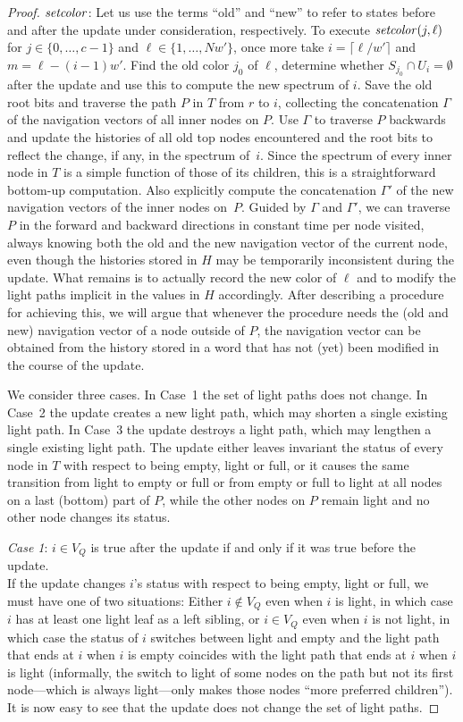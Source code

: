 \documentclass[envcountsame,envcountsect,undated,nolinenumbers]{lnthi}
\def\Tvn#1{\hbox{\textit{#1\/}}}
\def\Tceil#1{\lceil #1\rceil}
\begin{document}
\begin{proof}
\medskip\noindent
$\Tvn{setcolor}$:
Let us use the terms ``old'' and ``new'' to refer
to states before and after the update
under consideration, respectively.
To execute $\Tvn{setcolor}(j,\ell)$
for $j\in\{0,\ldots,c-1\}$ and $\ell\in\{1,\ldots,N w'\}$,
once more take
$i=\Tceil{{\ell/{w'}}}$ and $m=\ell-(i-1)w'$.
Find the old color $j_0$ of $\ell$,
determine whether $S_{j_0}\cap U_{i}=\emptyset$
after the update and use this
to compute the new spectrum of $i$.
Save the old root bits and
traverse the path $P$ in $T$ from $r$ to $i$, collecting
the concatenation $\Gamma$ of the navigation vectors
of all inner nodes on $P$.
Use $\Gamma$ to traverse $P$ backwards
and update the histories of all old top nodes
encountered and the root bits to reflect the change,
if any, in the spectrum of~$i$.
Since the spectrum of every inner node
in $T$ is a simple function of those of
its children, this is a straightforward
bottom-up computation.
Also explicitly compute the concatenation
$\Gamma'$
of the
new navigation vectors of the inner nodes on~$P$.
Guided by $\Gamma$ and $\Gamma'$, we can traverse $P$
in the forward and backward directions
in constant time per node visited, always
knowing both the old and the new navigation vector
of the current node, even though the
histories stored in $H$ may be temporarily
inconsistent during the update.
What remains is to actually record the new
color of $\ell$ and to modify the light paths
implicit in the values in $H$ accordingly.
After describing a procedure for achieving this,
we will argue that whenever the procedure needs the
(old and new) navigation vector of a node
outside of $P$, the navigation vector can
be obtained from the history stored in
a word that has not (yet) been modified in the
course of the update.

We consider three cases.
In Case~1 the set of light paths does not change.
In Case~2 the update creates a new light path,
which may shorten a single existing light path.
In Case~3 the update destroys
a light path, which may
lengthen a single existing light path.
The update either leaves invariant the status of
every node in $T$ with respect to being
empty, light or full,
or it causes the same transition from light
to empty or full or from empty or full
to light at all nodes
on a last (bottom) part of $P$, while the
other nodes on $P$ remain light and no other
node changes its status.

\medskip
\emph{Case 1}:
$i\in V_Q$
is true after the update
if and only if it was true before the update.\\
If the update changes $i$'s status with respect to
being empty, light or full, we must have one of
two situations:
Either $i\not\in V_Q$ even when $i$ is light,
in which case $i$ has at least one
light leaf as a left sibling,
or $i\in V_Q$ even when $i$ is not light,
in which case the status of $i$ switches between
light and empty and the light path that ends at
$i$ when $i$ is empty coincides with the
light path that ends at $i$ when $i$ is light
(informally, the switch to light of some nodes on the
path but not its first node---which
is always light---only makes
those nodes ``more preferred children'').
It is now easy to see that the update does
not change the set of light paths.


\end{proof}
\end{document}
